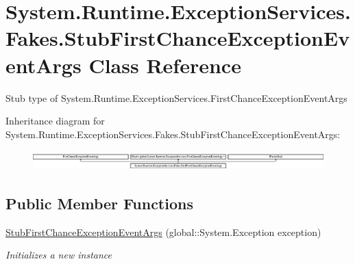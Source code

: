 \hypertarget{class_system_1_1_runtime_1_1_exception_services_1_1_fakes_1_1_stub_first_chance_exception_event_args}{\section{System.\-Runtime.\-Exception\-Services.\-Fakes.\-Stub\-First\-Chance\-Exception\-Event\-Args Class Reference}
\label{class_system_1_1_runtime_1_1_exception_services_1_1_fakes_1_1_stub_first_chance_exception_event_args}
}


Stub type of System.\-Runtime.\-Exception\-Services.\-First\-Chance\-Exception\-Event\-Args 


Inheritance diagram for System.\-Runtime.\-Exception\-Services.\-Fakes.\-Stub\-First\-Chance\-Exception\-Event\-Args\-:\begin{figure}[H]
\begin{center}
\leavevmode
\includegraphics[height=0.755736cm]{class_system_1_1_runtime_1_1_exception_services_1_1_fakes_1_1_stub_first_chance_exception_event_args}
\end{center}
\end{figure}
\subsection*{Public Member Functions}
\begin{DoxyCompactItemize}
\item 
\hyperlink{class_system_1_1_runtime_1_1_exception_services_1_1_fakes_1_1_stub_first_chance_exception_event_args_ae19806e3a8b27aa6c57a2d2857db87ba}{Stub\-First\-Chance\-Exception\-Event\-Args} (global\-::\-System.\-Exception exception)
\begin{DoxyCompactList}\small\item\em Initializes a new instance\end{DoxyCompactList}\end{DoxyCompactItemize}
